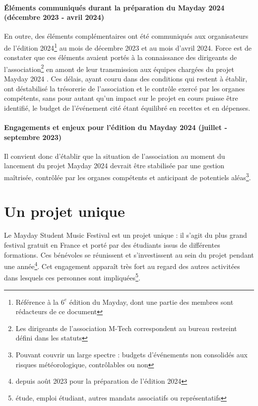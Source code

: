 \documentclass[12pt,a4paper]{report}
\begin{document}
\paragraph*{Éléments communiqués durant la préparation du Mayday 2024 (décembre 2023 - avril 2024)}
En outre, des éléments complémentaires ont été communiqués aux organisateurs de l'édition 2024\footnote{Référence à la $6^e$ édition du Mayday, dont une partie des membres sont rédacteurs de ce document} au mois de décembre 2023 et au mois d'avril 2024. Force est de constater que ces éléments avaient portés à la connaissance des dirigeants de l'association\footnote{Les dirigeants de l'association M-Tech correspondent au bureau restreint défini dans les statuts} en amont de leur transmission aux équipes chargées du projet \og Mayday 2024 \fg{}. Ces délais, ayant couru dans des conditions qui restent à établir, ont déstabilisé la trésorerie de l'association et le contrôle exercé par les organes compétents, sans pour autant qu'un impact sur le projet en cours puisse être identifié, le budget de l'événement cité étant équilibré en recettes et en dépenses.

\paragraph*{Engagements et enjeux pour l'édition du Mayday 2024 (juillet - septembre 2023)}
Il convient donc d'établir que la situation de l'association au moment du lancement du projet \og Mayday 2024 \fg{} devrait être stabilisée par une gestion maîtrisée, contrôlée par les organes compétents et anticipant de potentiels aléas\footnote{Pouvant couvrir un large spectre : budgets d'événements non consolidés aux risques météorologique, contrôlables ou non}.

\section*{Un projet unique}

Le Mayday Student Music Festival est un projet unique : il s'agit du plus grand festival gratuit en France et porté par des étudiants issus de différentes formations. Ces bénévoles se réunissent et s'investissent au sein du projet pendant une année\footnote{depuis août 2023 pour la préparation de l'édition 2024}. Cet engagement apparaît très fort au regard des autres activitées dans lesquels ces personnes sont impliquées\footnote{étude, emploi étudiant, autres mandats associatifs ou représentatifs}. \\
\end{document}
